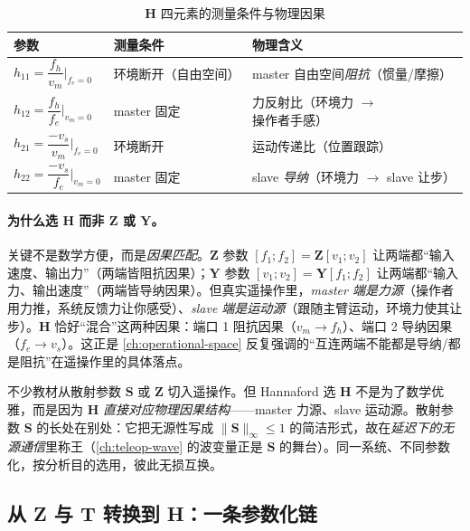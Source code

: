 \begin{table}[H]\centering\small
\caption{$\mathbf H$ 四元素的测量条件与物理因果}
\label{tab:tt-hphys}
\begin{tabular}{lll}
\toprule
参数 & 测量条件 & 物理含义 \\
\midrule
$h_{11}=\dfrac{f_h}{v_m}\Big|_{f_e=0}$ & 环境断开（自由空间） & master 自由空间\emph{阻抗}（惯量/摩擦） \\[6pt]
$h_{12}=\dfrac{f_h}{f_e}\Big|_{v_m=0}$ & master 固定 & 力反射比（环境力 $\to$ 操作者手感） \\[6pt]
$h_{21}=\dfrac{-v_s}{v_m}\Big|_{f_e=0}$ & 环境断开 & 运动传递比（位置跟踪） \\[6pt]
$h_{22}=\dfrac{-v_s}{f_e}\Big|_{v_m=0}$ & master 固定 & slave \emph{导纳}（环境力 $\to$ slave 让步） \\
\bottomrule
\end{tabular}
\end{table}

\paragraph{为什么选 $\mathbf H$ 而非 $\mathbf Z$ 或 $\mathbf Y$。}
关键不是数学方便，而是\emph{因果匹配}。$\mathbf Z$ 参数 $[f_1;f_2]=\mathbf Z[v_1;v_2]$ 让两端都“输入速度、输出力”（两端皆阻抗因果）；$\mathbf Y$ 参数 $[v_1;v_2]=\mathbf Y[f_1;f_2]$ 让两端都“输入力、输出速度”（两端皆导纳因果）。但真实遥操作里，\emph{master 端是力源}（操作者用力推，系统反馈力让你感受）、\emph{slave 端是运动源}（跟随主臂运动，环境力使其让步）。$\mathbf H$ 恰好“混合”这两种因果：端口 1 阻抗因果（$v_m\to f_h$）、端口 2 导纳因果（$f_e\to v_s$）。这正是 \cref{ch:operational-space} 反复强调的“互连两端不能都是导纳/都是阻抗”在遥操作里的具体落点。

\begin{pitfall}[纠正：“遥操作必须从散射参数学起”]
不少教材从散射参数 $\mathbf S$ 或 $\mathbf Z$ 切入遥操作。但 Hannaford 选 $\mathbf H$ 不是为了数学优雅，而是因为 $\mathbf H$ \emph{直接对应物理因果结构}——master 力源、slave 运动源。散射参数 $\mathbf S$ 的长处在别处：它把无源性写成 $\|\mathbf S\|_\infty\le1$ 的简洁形式，故在\emph{延迟下的无源通信}里称王（\cref{ch:teleop-wave} 的波变量正是 $\mathbf S$ 的舞台）。同一系统、不同参数化，按分析目的选用，彼此无损互换。
\end{pitfall}

\subsection{从 Z 与 T 转换到 H：一条参数化链}
\label{sec:tt-convert}

